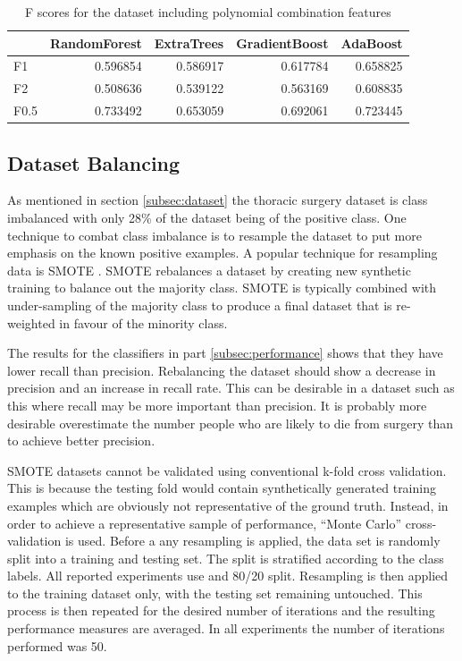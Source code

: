 \documentclass[journal]{IEEEtran}
\begin{document}
\begin{table}
\caption{F scores for the dataset including polynomial combination features}

\begin{tabular}{lrrrr}
{} &  RandomForest &  ExtraTrees &  GradientBoost &  AdaBoost \\
\hline
F1   &      0.596854 &    0.586917 &       0.617784 &  0.658825 \\
F2   &      0.508636 &    0.539122 &       0.563169 &  0.608835 \\
F0.5 &      0.733492 &    0.653059 &       0.692061 &  0.723445 \\
\end{tabular}

\label{table:f-scores-poly}	
\end{table}

\subsection{Dataset Balancing}
\label{subsec:dataset-balancing}
As mentioned in section \ref{subsec:dataset} the thoracic surgery dataset is class imbalanced with only 28\% of the dataset being of the positive class. One technique to combat class imbalance is to resample the dataset to put more emphasis on the known positive examples. A popular technique for resampling data is SMOTE \cite{chawla2002smote}. SMOTE rebalances a dataset by creating new synthetic training to balance out the majority class. SMOTE is typically combined with under-sampling of the majority class to produce a final dataset that is re-weighted in favour of the minority class. 

The results for the classifiers in part \ref{subsec:performance} shows that they have lower recall than precision. Rebalancing the dataset should show a decrease in precision and an increase in recall rate. This can be desirable in a dataset such as this where recall may be more important than precision. It is probably more desirable overestimate the number people who are likely to die from surgery than to achieve better precision.

SMOTE datasets cannot be validated using conventional k-fold cross validation. This is because the testing fold would contain synthetically generated training examples which are obviously not representative of the ground truth. Instead, in order to achieve a representative sample of performance, ``Monte Carlo'' cross-validation \cite{dubitzky2007fundamentals} is used. Before a any resampling is applied, the data set is randomly split into a training and testing set. The split is stratified according to the class labels. All reported experiments use and 80/20 split. Resampling is then applied to the training dataset only, with the testing set remaining untouched. This process is then repeated for the desired number of iterations and the resulting performance measures are averaged. In all experiments the number of iterations performed was 50.  
\end{document}
